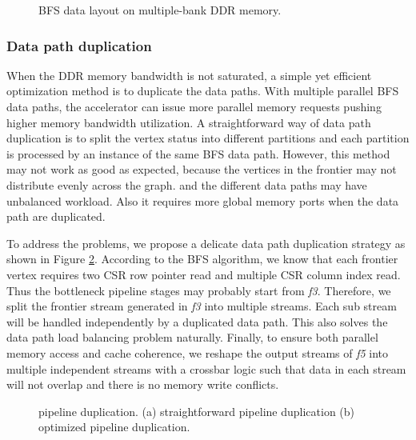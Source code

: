 \begin{figure}
    \caption{BFS data layout on multiple-bank DDR memory.}
\label{fig:csr-layout}
\vspace{-1em}
\end{figure}


\subsubsection{Data path duplication}
When the DDR memory bandwidth is not saturated, a simple 
yet efficient optimization method is to duplicate the data paths. 
With multiple parallel BFS data paths, the accelerator can issue more parallel 
memory requests pushing higher memory bandwidth utilization. A straightforward 
way of data path duplication is to split the vertex status into different 
partitions and each partition is processed by an instance of the same BFS data path.
However, this method may not work as good as expected, because 
the vertices in the frontier may not distribute evenly across the graph. 
and the different data paths may have unbalanced workload. Also it requires 
more global memory ports when the data path are duplicated.

To address the problems, we propose a delicate data path duplication strategy 
as shown in Figure \ref{fig:duplicate-pipeline}. According to the BFS algorithm, 
we know that each frontier vertex requires two CSR row pointer read and multiple 
CSR column index read. Thus the bottleneck pipeline stages may probably start 
from \textit{f3}. Therefore, we split the frontier stream generated in \textit{f3} into 
multiple streams. Each sub stream will be handled independently by a 
duplicated data path. This also solves the data path load balancing problem 
naturally. Finally, to ensure both parallel memory access and cache coherence,  
we reshape the output streams of \textit{f5} into multiple independent streams 
with a crossbar logic such that data in each stream will not overlap 
and there is no memory write conflicts. 

\begin{figure}
    \caption{pipeline duplication. (a) straightforward pipeline duplication 
    (b) optimized pipeline duplication.}
\label{fig:duplicate-pipeline}
\vspace{-1.5em}
\end{figure}

